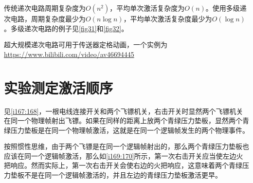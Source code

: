 传统递次电路周期复杂度为$O(n^2)$，平均单次激活复杂度为$O(n)$。使用多级递次电路，周期复杂度最少为$O(n\log n)$，平均单次激活复杂度最少为$O(\log n)$。多级递次电路的例子见\autoref{fig31}和\autoref{fig32}。

超大规模递次电路可用于传送器定格动画，一个实例为\url{https://www.bilibili.com/video/av46694445}

\section{实验测定激活顺序}

见\autoref{i167:168}，一根电线连接开关和两个飞镖机关，右击开关时显然两个飞镖机关在同一个物理帧射出飞镖。如果在同样的距离上放两个青绿压力垫板，显然两个青绿压力垫板是在同一个物理帧激活，这就是在同一个逻辑帧发生的两个物理事件。

\begin{figure}[!ht]
\begin{center}
\qquad
{}
\end{center}
\caption{}
\label{i167:168}
\end{figure}

按照惯性思维，由于两个飞镖是在同一个逻辑帧射出的，那么两个青绿压力垫板也应该在同一个逻辑帧激活，那么如\autoref{i169:170}所示，第一次右击开关应当使左边火把响应。然而实际上，第一次右击开关会使右边的火把响应，这意味着两个青绿压力垫板不是在同一个逻辑帧激活的，并且左边的青绿压力垫板激活更早。

\begin{figure}[!ht]
\begin{center}
\qquad
{}
\end{center}
\caption{}
\label{i169:170}
\end{figure}

